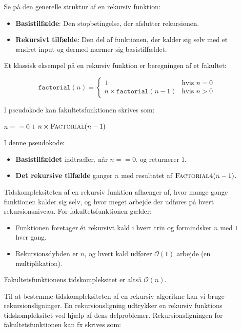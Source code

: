 Se på den generelle struktur af en rekursiv funktion:

\begin{itemize}
    \item \textbf{Basistilfælde}: Den stopbetingelse, der afslutter rekursionen.
    \item \textbf{Rekursivt tilfælde}: Den del af funktionen, der kalder sig selv med et ændret input og dermed nærmer sig basistilfældet.
\end{itemize}

Et klassisk eksempel på en rekursiv funktion er beregningen af et fakultet:

\[
\texttt{factorial}(n) = 
\begin{cases}
1 & \text{hvis } n = 0 \\
n \times \texttt{factorial}(n-1) & \text{hvis } n > 0
\end{cases}
\]

I pseudokode kan fakultetsfunktionen skrives som:

\begin{codebox}
    \li \If $n == 0$ \Then
    \li     \Return $1$
        \End
    \li \Return $n \times \proc{Factorial}(n-1)$
\end{codebox}

I denne pseudokode:
\begin{itemize}
    \item \textbf{Basistilfældet} indtræffer, når $n == 0$, og returnerer $1$.
    \item \textbf{Det rekursive tilfælde} ganger $n$ med resultatet af $\proc{Factorial4}(n-1)$.
\end{itemize}

Tidskompleksiteten af en rekursiv funktion afhænger af, hvor mange gange funktionen kalder sig selv, og hvor meget arbejde der udføres på hvert rekursionsniveau. For fakultetsfunktionen gælder:

\begin{itemize}
    \item Funktionen foretager ét rekursivt kald i hvert trin og formindsker $n$ med $1$ hver gang.
    \item Rekursionsdybden er $n$, og hvert kald udfører $\mathcal{O}(1)$ arbejde (en multiplikation).
\end{itemize}

Fakultetsfunktionens tidskompleksitet er altså $\mathcal{O}(n)$.

Til at bestemme tidskompleksiteten af en rekursiv algoritme kan vi bruge rekursionsligninger. En rekursionsligning udtrykker en rekursiv funktions tidskompleksitet ved hjælp af dens delproblemer. Rekursionsligningen for fakultetsfunktionen kan fx skrives som:

